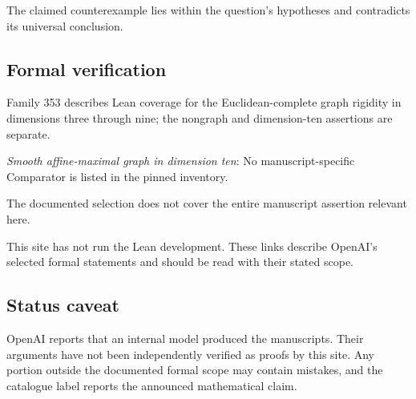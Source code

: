 \documentclass[11pt]{article}
\begin{document}
The claimed counterexample lies within the question’s hypotheses and contradicts its universal conclusion.

\subsection{Formal verification}
Family 353 describes Lean coverage for the Euclidean-complete graph rigidity in dimensions three through nine; the nongraph and dimension-ten assertions are separate.

\textit{Smooth affine-maximal graph in dimension ten}: No manuscript-specific Comparator is listed in the pinned inventory.

The documented selection does not cover the entire manuscript assertion relevant here.

This site has not run the Lean development. These links describe OpenAI’s selected formal statements and should be read with their stated scope.

\subsection{Status caveat}
OpenAI reports that an internal model produced the manuscripts. Their arguments have not been independently verified as proofs by this site. Any portion outside the documented formal scope may contain mistakes, and the catalogue label reports the announced mathematical claim.
\end{document}
